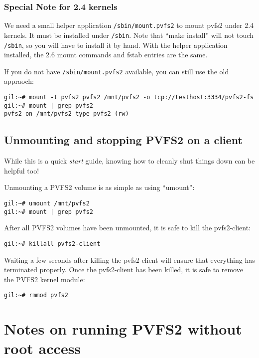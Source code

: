 \documentclass[11pt, letterpaper]{article}
\begin{document}
\subsubsection{Special Note for 2.4 kernels}

We need a small helper application \texttt{/sbin/mount.pvfs2} to mount pvfs2
under 2.4 kernels.   It must be installed under \texttt{/sbin}.  Note that
``make install'' will not touch \texttt{/sbin}, so you will have to install it
by hand.  With the helper application installed, the 2.6 mount commands and
fstab entries are the same.  

If you do not have \texttt{/sbin/mount.pvfs2} available, you can still use the
old appraoch:

\begin{verbatim}
gil:~# mount -t pvfs2 pvfs2 /mnt/pvfs2 -o tcp://testhost:3334/pvfs2-fs
gil:~# mount | grep pvfs2
pvfs2 on /mnt/pvfs2 type pvfs2 (rw)
\end{verbatim}


\subsection{Unmounting and stopping PVFS2 on a client}

While this is a quick \emph{start} guide, knowing how to cleanly shut
things down can be helpful too!

Unmounting a PVFS2 volume is as simple as using ``umount'':
\begin{verbatim}
gil:~# umount /mnt/pvfs2
gil:~# mount | grep pvfs2
\end{verbatim}

After all PVFS2 volumes have been unmounted, it is safe to kill the
pvfs2-client:
\begin{verbatim}
gil:~# killall pvfs2-client
\end{verbatim}

Waiting a few seconds after killing the pvfs2-client will ensure that
everything has terminated properly.  Once the pvfs2-client has been
killed, it is safe to remove the PVFS2 kernel module:
\begin{verbatim}
gil:~# rmmod pvfs2
\end{verbatim}

\appendix

\section{Notes on running PVFS2 without root access}
\end{document}
